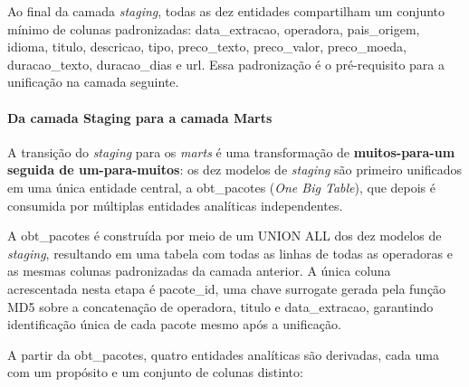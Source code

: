Ao final da camada \textit{staging}, todas as dez entidades compartilham um
conjunto mínimo de colunas padronizadas: data\_extracao,
operadora, pais\_origem, idioma, titulo,
descricao, tipo, preco\_texto, preco\_valor,
preco\_moeda, duracao\_texto, duracao\_dias e
url. Essa padronização é o pré-requisito para a unificação na camada
seguinte.

\paragraph{Da camada Staging para a camada Marts}

A transição do \textit{staging} para os \textit{marts} é uma transformação de
\textbf{muitos-para-um seguida de um-para-muitos}: os dez modelos de
\textit{staging} são primeiro unificados em uma única entidade central, a
obt\_pacotes (\textit{One Big Table}), que depois é consumida por
múltiplas entidades analíticas independentes.

A obt\_pacotes é construída por meio de um UNION ALL dos
dez modelos de \textit{staging}, resultando em uma tabela com todas as linhas de
todas as operadoras e as mesmas colunas padronizadas da camada anterior. A única
coluna acrescentada nesta etapa é pacote\_id, uma chave surrogate gerada
pela função MD5 sobre a concatenação de operadora, titulo e
data\_extracao, garantindo identificação única de cada pacote mesmo após
a unificação.

A partir da obt\_pacotes, quatro entidades analíticas são derivadas,
cada uma com um propósito e um conjunto de colunas distinto:

